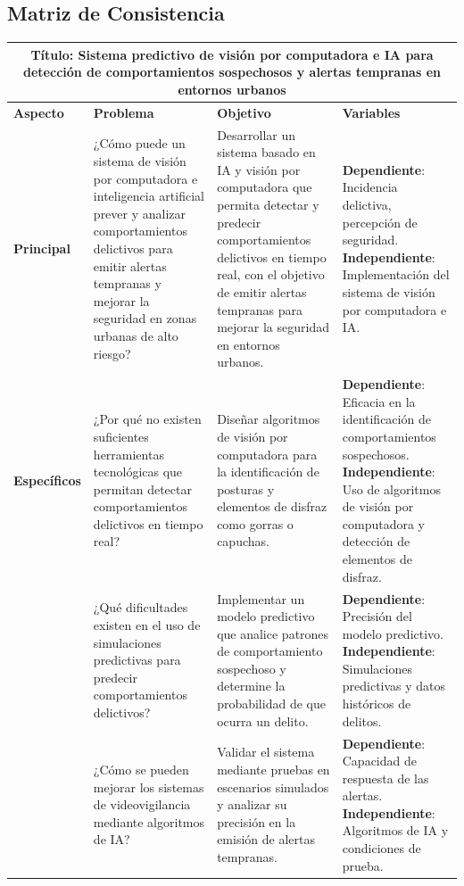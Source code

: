 	\begin{landscape}
		\section{Matriz de Consistencia}

                \begin{longtable}{| m{4cm} | m{7cm} | m{7cm} | m{7cm} |}
    \hline
    \multicolumn{4}{|c|}{\textbf{Título: Sistema predictivo de visión por computadora e IA para detección de comportamientos sospechosos y alertas tempranas en entornos urbanos}} \\ \hline
    \textbf{Aspecto} & \textbf{Problema} & \textbf{Objetivo} & \textbf{Variables} \\ \hline
    
    \textbf{Principal} & ¿Cómo puede un sistema de visión por computadora e inteligencia artificial prever y analizar comportamientos delictivos para emitir alertas tempranas y mejorar la seguridad en zonas urbanas de alto riesgo? & Desarrollar un sistema basado en IA y visión por computadora que permita detectar y predecir comportamientos delictivos en tiempo real, con el objetivo de emitir alertas tempranas para mejorar la seguridad en entornos urbanos. & \textbf{Dependiente}: Incidencia delictiva, percepción de seguridad. \newline \textbf{Independiente}: Implementación del sistema de visión por computadora e IA. \\ \hline
    
    \textbf{Específicos} & ¿Por qué no existen suficientes herramientas tecnológicas que permitan detectar comportamientos delictivos en tiempo real? & Diseñar algoritmos de visión por computadora para la identificación de posturas y elementos de disfraz como gorras o capuchas. & \textbf{Dependiente}: Eficacia en la identificación de comportamientos sospechosos. \newline \textbf{Independiente}: Uso de algoritmos de visión por computadora y detección de elementos de disfraz. \\ \hline
    
    & ¿Qué dificultades existen en el uso de simulaciones predictivas para predecir comportamientos delictivos? & Implementar un modelo predictivo que analice patrones de comportamiento sospechoso y determine la probabilidad de que ocurra un delito. & \textbf{Dependiente}: Precisión del modelo predictivo. \newline \textbf{Independiente}: Simulaciones predictivas y datos históricos de delitos. \\ \hline
    
    & ¿Cómo se pueden mejorar los sistemas de videovigilancia mediante algoritmos de IA? & Validar el sistema mediante pruebas en escenarios simulados y analizar su precisión en la emisión de alertas tempranas. & \textbf{Dependiente}: Capacidad de respuesta de las alertas. \newline \textbf{Independiente}: Algoritmos de IA y condiciones de prueba. \\ \hline
\end{longtable}
\end{landscape}

